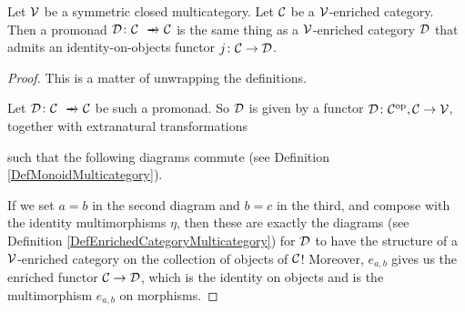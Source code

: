 \documentclass{article}
\begin{document}
\begin{proposition}
  \label{PropPromonadsAreCategories}
  Let ${\mathcal{V}}$ be a symmetric closed multicategory.  
  Let ${\mathcal{C}}$ be a ${\mathcal{V}}$-enriched category.  
  Then a promonad $\D\from \C\pto \C$ is the same thing as a ${\mathcal{V}}$-enriched category ${\mathcal{D}}$ that admits an identity-on-objects functor $j\colon {\mathcal{C}} \to {\mathcal{D}}$.
\end{proposition}
\begin{proof}
  This is a matter of unwrapping the definitions.

  Let $\D\from \C \pto \C$ be such a promonad.  
  So ${\mathcal{D}}$ is given by a functor ${\mathcal{D}} \colon {\mathcal{C}}^{\mathrm{op}},{\mathcal{C}} \to {\mathcal{V}}$, together with extranatural transformations
  such that the following diagrams commute (see Definition \ref{DefMonoidMulticategory}).
  If we set $a=b$ in the second diagram and $b=c$ in the third, and compose with the identity multimorphisms $\eta$, then these are exactly the diagrams (see Definition \ref{DefEnrichedCategoryMulticategory}) for ${\mathcal{D}}$ to have the structure of a ${\mathcal{V}}$-enriched category on the collection of objects of ${\mathcal{C}}$!
  Moreover, $e_{a,b}$ gives us the enriched functor ${\mathcal{C}}\to {\mathcal{D}}$, which is the identity on objects and is the multimorphism $e_{a,b}$ on morphisms.


\end{proof}
\end{document}

